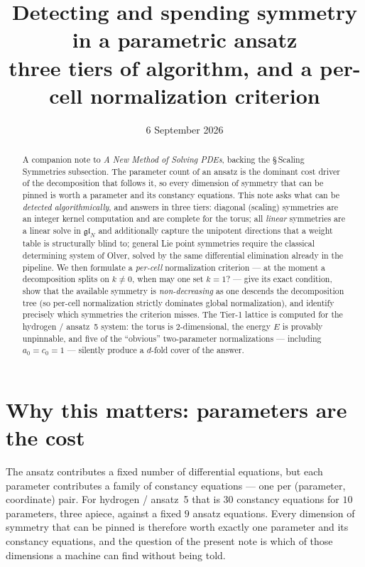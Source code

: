 \documentclass[11pt]{article}
\title{Detecting and spending symmetry in a parametric ansatz\\
       {\large three tiers of algorithm, and a per-cell normalization criterion}}
\author{}
\date{6 September 2026}
\newcommand{\gl}{\mathfrak{gl}}
\theoremstyle{plain}
\theoremstyle{definition}
\theoremstyle{remark}
\begin{document}
\maketitle

\begin{abstract}
\noindent
A companion note to \emph{A New Method of Solving PDEs}, backing the
\S\,Scaling Symmetries subsection. The parameter count of an ansatz is the
dominant cost driver of the decomposition that follows it, so every dimension
of symmetry that can be pinned is worth a parameter and its constancy
equations. This note asks what can be \emph{detected algorithmically}, and
answers in three tiers: diagonal (scaling) symmetries are an integer kernel
computation and are complete for the torus; all \emph{linear} symmetries are a
linear solve in $\gl_N$ and additionally capture the unipotent directions that
a weight table is structurally blind to; general Lie point symmetries require
the classical determining system of Olver, solved by the same differential
elimination already in the pipeline. We then formulate a
\emph{per-cell} normalization criterion --- at the moment a decomposition
splits on $k \neq 0$, when may one set $k = 1$? --- give its exact condition,
show that the available symmetry is \emph{non-decreasing} as one descends the
decomposition tree (so per-cell normalization strictly dominates global
normalization), and identify precisely which symmetries the criterion misses.
The Tier-1 lattice is computed for the hydrogen / ansatz~5 system: the torus is
$2$-dimensional, the energy $E$ is provably unpinnable, and five of the
``obvious'' two-parameter normalizations --- including $a_0 = c_0 = 1$ ---
silently produce a $d$-fold cover of the answer.
\end{abstract}

\section{Why this matters: parameters are the cost}
\label{sec:cost}

The ansatz contributes a fixed number of differential equations, but each
parameter contributes a family of constancy equations --- one per (parameter,
coordinate) pair. For hydrogen / ansatz~5 that is $30$ constancy equations for
$10$ parameters, three apiece, against a fixed $9$ ansatz equations. Every
dimension of symmetry that can be pinned is therefore worth exactly one
parameter and its constancy equations, and the question of the present note is
which of those dimensions a machine can find without being told.
\end{document}

